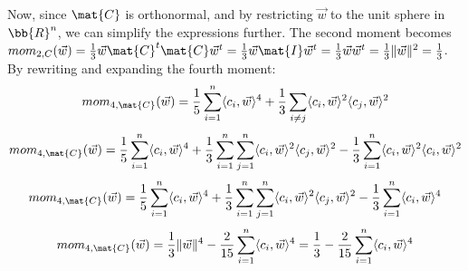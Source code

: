\begin{itemize}
    Now, since $\mat{C}$ is orthonormal, and by restricting $\vec{w}$ to the unit sphere in $\bb{R}^n$, we can simplify the expressions further.
    The second moment becomes $mom_{2, C}(\vec{w}) = \frac{1}{3} \vec{w} \mat{C}^t \mat{C} \vec{w}^t = \frac{1}{3}\vec{w} \mat{I} \vec{w}^t 
    = \frac{1}{3} \vec{w}\vec{w}^t = \frac{1}{3} \lVert \vec{w} \rVert ^2 = \frac{1}{3}$. \\
    By rewriting and expanding the fourth moment:
    \[ mom_{4, \mat{C}} (\vec{w}) = \frac{1}{5} \sum_{i=1}^{n} \langle c_i, \vec{w} \rangle ^4 + \frac{1}{3} \sum_{i \neq j} \langle c_i, \vec{w} \rangle ^2 \langle c_j, \vec{w} \rangle ^2\]
    \[ mom_{4, \mat{C}} (\vec{w}) = \frac{1}{5} \sum_{i=1}^{n} \langle c_i, \vec{w} \rangle ^4 + 
        \frac{1}{3} \sum_{i=1}^{n} \sum_{j=1}^n \langle c_i, \vec{w} \rangle ^2 \langle c_j, \vec{w} \rangle ^2 -
    \frac{1}{3}\sum_{i=1}^{n} \langle c_i, \vec{w} \rangle ^2 \langle c_i, \vec{w} \rangle ^2\]
    \[ mom_{4, \mat{C}} (\vec{w}) = \frac{1}{5} \sum_{i=1}^{n} \langle c_i, \vec{w} \rangle ^4 + 
    \frac{1}{3} \sum_{i=1}^n \sum_{j=1}^n \langle c_i, \vec{w} \rangle ^2 \langle c_j, \vec{w} \rangle ^2 -
\frac{1}{3}\sum_{i=1}^{n} \langle c_i, \vec{w} \rangle ^4 \]
    \[ mom_{4, \mat{C}} (\vec{w}) = \frac{1}{3} \lVert \vec{w} \rVert ^4 - 
        \frac{2}{15}\sum_{i=1}^{n} \langle c_i, \vec{w} \rangle ^4 = \frac{1}{3} - 
    \frac{2}{15}\sum_{i=1}^n \langle c_i, \vec{w} \rangle ^4\]

\end{itemize}

